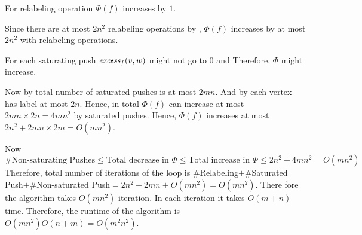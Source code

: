\begin{observation}
	For relabeling operation $\Phi(f)$ increases by $1$.
\end{observation}
Since there are at most $2n^2$ relabeling operations by  , $\Phi(f)$ increases by at most $2n^2$ with relabeling operations.
\begin{observation}
	For each saturating push $\emph{excess}_f(v,w)$ might not go to $0$ and Therefore, $\Phi$ might increase.
\end{observation}
Now by  total number of saturated pushes is at most $2mn$. And by  each vertex has label at most $2n$. Hence, in total $\Phi(f)$ can increase at most $2mn\times 2n=4mn^2$ by saturated pushes. Hence, $\Phi(f)$ increases at most $2n^2+2mn\times 2m=O(mn^2)$.


Now $$\#\text{Non-saturating Pushes}  \leq \text{Total decrease in }\Phi\leq \text{Total increase in }\Phi\leq 2n^2+4mn^2=O(mn^2)$$
Therefore, total number of iterations of the  loop is $\#$Relabeling$+\#$Saturated Push$+\#$Non-saturated Push$= 2n^2+2mn+O(mn^2)=O(mn^2)$.  There fore the algorithm takes $O(mn^2)$ iteration. In each iteration it takes $O(m+n)$ time. Therefore, the runtime of the algorithm is $O(mn^2)O(n+m)=O(m^2n^2)$.
